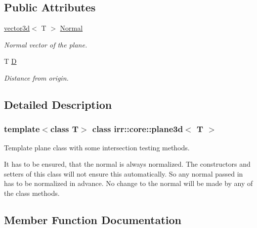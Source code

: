 \subsection*{Public Attributes}
\begin{DoxyCompactItemize}
\item 
\mbox{\label{classirr_1_1core_1_1plane3d_a6531e265acae238999976222f92129f1}} 
\hyperlink{classirr_1_1core_1_1vector3d}{vector3d}$<$ T $>$ \hyperlink{classirr_1_1core_1_1plane3d_a6531e265acae238999976222f92129f1}{Normal}
\begin{DoxyCompactList}\small\item\em Normal vector of the plane. \end{DoxyCompactList}\item 
\mbox{\label{classirr_1_1core_1_1plane3d_afa304cf77cf1a3aae2351d5add5606a8}} 
T \hyperlink{classirr_1_1core_1_1plane3d_afa304cf77cf1a3aae2351d5add5606a8}{D}
\begin{DoxyCompactList}\small\item\em Distance from origin. \end{DoxyCompactList}\end{DoxyCompactItemize}


\subsection{Detailed Description}
\subsubsection*{template$<$class T$>$\newline
class irr\+::core\+::plane3d$<$ T $>$}

Template plane class with some intersection testing methods. 

It has to be ensured, that the normal is always normalized. The constructors and setters of this class will not ensure this automatically. So any normal passed in has to be normalized in advance. No change to the normal will be made by any of the class methods. 

\subsection{Member Function Documentation}
\mbox{\label{classirr_1_1core_1_1plane3d_a14ba310b0ed9d14ce575f1c783cbd9a5}} 
